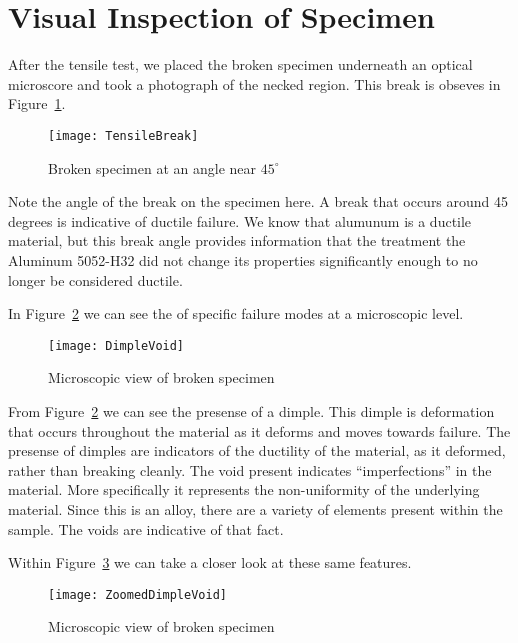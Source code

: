 \documentclass{article}
\begin{document}
\section{Visual Inspection of Specimen}
After the tensile test, we placed the broken specimen underneath an optical microscore and took a photograph of the necked region. This break is obseves in Figure~\ref{fig:TensileBreak}.

\begin{figure}[H]
\begin{center}
\texttt{[image: TensileBreak]}
\caption{Broken specimen at an angle near $45^\circ$}
\label{fig:TensileBreak}
\end{center}
\end{figure}

Note the angle of the break on the specimen here. A break that occurs around 45 degrees is indicative of ductile failure. We know that alumunum is a ductile material, but this break angle provides information that the treatment the Aluminum 5052-H32 did not change its properties significantly enough to no longer be considered ductile.

In Figure~\ref{fig:DimpleVoid} we can see the of specific failure modes at a microscopic level.
\begin{figure}[H]
\begin{center}
\texttt{[image: DimpleVoid]}
\caption{Microscopic view of broken specimen}
\label{fig:DimpleVoid}
\end{center}
\end{figure}

From Figure~\ref{fig:DimpleVoid} we can see the presense of a dimple. This dimple is deformation that occurs throughout the material as it deforms and moves towards failure. The presense of dimples are indicators of the ductility of the material, as it deformed, rather than breaking cleanly. The void present indicates ``imperfections'' in the material. More specifically it represents the non-uniformity of the underlying material. Since this is an alloy, there are a variety of elements present within the sample. The voids are indicative of that fact.

Within Figure~\ref{fig:ZoomedDimpleVoid} we can take a closer look at these same features.
\begin{figure}[H]
\begin{center}
\texttt{[image: ZoomedDimpleVoid]}
\caption{Microscopic view of broken specimen}
\label{fig:ZoomedDimpleVoid}
\end{center}
\end{figure}
\end{document}
